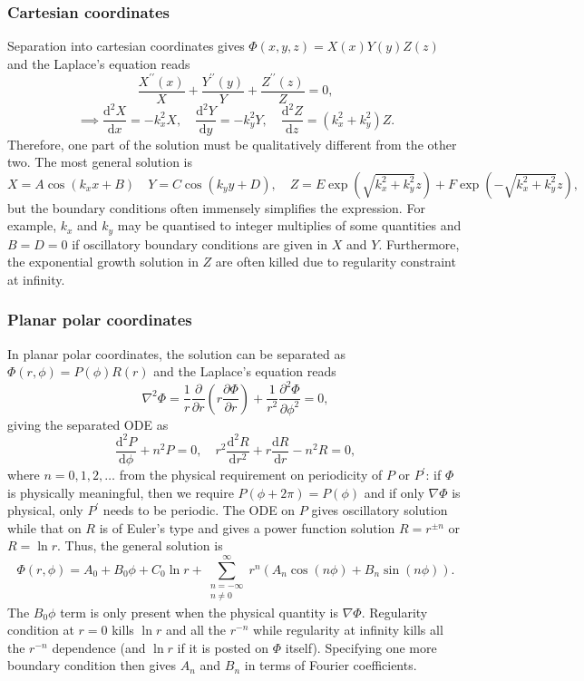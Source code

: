 \documentclass{article}
\begin{document}
\subsubsection{Cartesian coordinates}
Separation into cartesian coordinates gives $\Phi(x,y,z) = X(x)Y(y)Z(z)$ and the Laplace's equation reads 
\[
    \frac{X^{\prime\prime} (x)}{X} + \frac{Y^{\prime\prime} (y)}{Y} + \frac{Z^{\prime\prime} (z)}{Z} = 0, 
\] 
\[
    \implies \frac{\mathrm{d}^{2} X}{\mathrm{d}x} = - k_x ^{2}  X, \quad 
    \frac{\mathrm{d}^{2} Y}{\mathrm{d}y} = -k_y ^{2} Y, \quad 
    \frac{\mathrm{d}^{2} Z}{\mathrm{d}z} = (k_x ^{2} + k_y ^{2} ) Z. 
\]
Therefore, one part of the solution must be qualitatively different from the other two. The most general solution is 
\[
    X = A \cos(k_x x + B) \quad 
    Y = C \cos(k_y y + D), \quad
    Z = E \exp(\sqrt{k_x ^{2}  + k_y ^{2} }z ) + F \exp(-\sqrt{k_x ^{2}  + k_y ^{2} }z ),
\]
but the boundary conditions often immensely simplifies the expression. For example, $k_x$ and $k_y$ may be quantised to integer multiplies of some quantities and $B=D=0$ if oscillatory boundary conditions are given in $X$ and $Y.$ Furthermore, the exponential growth solution in $Z$ are often killed due to regularity constraint at infinity.

\subsubsection{Planar polar coordinates}
In planar polar coordinates, the solution can be separated as $\Phi(r,\phi) = P(\phi) R(r)$ and the Laplace's equation reads 
\[
    \nabla ^{2} \Phi  = \frac{1}{r}\frac{\partial }{\partial r} \left( r \frac{\partial \Phi }{\partial r} \right) 
    + \frac{1}{r^{2} } \frac{\partial ^{2} \Phi }{\partial \phi ^{2} } = 0,
\]
giving the separated ODE as
\[
    \frac{\mathrm{d}^{2} P}{\mathrm{d}\phi } + n^{2} P = 0, \quad 
    r^{2} \frac{\mathrm{d}^{2} R}{\mathrm{d}r^{2} } + r \frac{\mathrm{d}R}{\mathrm{d}r} - n^{2} R = 0,
\]
where $n = 0, 1, 2, \ldots $ from the physical requirement on periodicity of $P$ or $P^\prime$: if $\Phi$ is physically meaningful, then we require $P(\phi + 2\pi ) = P(\phi)$ and if only $\nabla \Phi$ is physical, only $P^\prime$ needs to be periodic. The ODE on $P$ gives oscillatory solution while that on $R$ is of Euler's type and gives a power function solution $R = r^{\pm n}$ or $R = \ln{r}$. Thus, the general solution is 
\[
    \boxed{
    \Phi(r,\phi) = A_0 + B_0 \phi + C_0 \ln{r} + 
    \sum_{\substack{n=-\infty \\ n \neq 0}}^{\infty } r^n (A_n \cos(n \phi ) + B_n \sin(n \phi )).} 
\]
The $B_0 \phi$ term is only present when the physical quantity is $\nabla \Phi.$ Regularity condition at $r=0$ kills $\ln{r}$ and all the $r^{-n}$ while regularity at infinity kills all the $r^{-n}$ dependence (and $\ln{r}$ if it is posted on $\Phi$ itself). Specifying one more boundary condition then gives $A_n$ and $B_n$ in terms of Fourier coefficients. 
\end{document}

